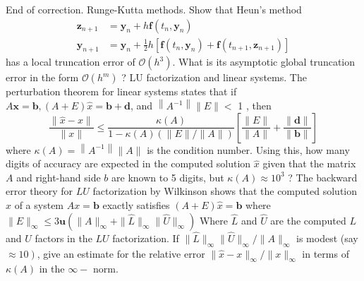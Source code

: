 \documentclass[14pt]{extarticle}
\begin{document}
End of correction.
\newpage
Runge-Kutta methods. Show that Heun's method
$$
\begin{aligned}
\mathbf{z}_{n+1} &=\mathbf{y}_{n}+h \mathbf{f}\left(t_{n}, \mathbf{y}_{n}\right) \\
\mathbf{y}_{n+1} &=\mathbf{y}_{n}+\frac{1}{2} h\left[\mathbf{f}\left(t_{n}, \mathbf{y}_{n}\right)+\mathbf{f}\left(t_{n+1}, \mathbf{z}_{n+1}\right)\right]
\end{aligned}
$$
has a local truncation error of $\mathcal{O}\left(h^{3}\right)$. What is its asymptotic global truncation error in the form $\mathcal{O}\left(h^{m}\right)$ ?
\newpage
LU factorization and linear systems. The perturbation theorem for linear systems states that if $A \boldsymbol{x}=\boldsymbol{b},(A+E) \widehat{x}=\boldsymbol{b}+\boldsymbol{d}$, and $\left\|A^{-1}\right\|\|E\|<$ 1 , then
$$
\frac{\|\widehat{x}-x\|}{\|x\|} \leq \frac{\kappa(A)}{1-\kappa(A)(\|E\| /\|A\|)}\left[\frac{\|E\|}{\|A\|}+\frac{\|\boldsymbol{d}\|}{\|\boldsymbol{b}\|}\right]
$$
where $\kappa(A)=\left\|A^{-1}\right\|\|A\|$ is the condition number. Using this, how many digits of accuracy are expected in the computed solution $\hat{x}$ given that the matrix $A$ and right-hand side $b$ are known to 5 digits, but $\kappa(A) \approx 10^{3}$ ? The backward error theory for $L U$ factorization by Wilkinson shows that the computed solution $\widehat{x}$ of a system $A x=\boldsymbol{b}$ exactly satisfies $(A+E) \widehat{x}=\boldsymbol{b}$ where $\|E\|_{\infty} \leq 3 \mathbf{u}\left(\|A\|_{\infty}+\|\widehat{L}\|_{\infty}\|\widehat{U}\|_{\infty}\right)$ Where $\hat{L}$ and $\widehat{U}$ are the computed $L$ and $U$ factors in the $L U$ factorization. If $\|\widehat{L}\|_{\infty}\|\widehat{U}\|_{\infty} /\|A\|_{\infty}$ is modest (say $\left.\approx 10\right)$, give an estimate for the relative error $\|\widehat{x}-x\|_{\infty} /\|x\|_{\infty}$ in terms of $\kappa(A)$ in the $\infty-$ norm.
\newpage
\end{document}

